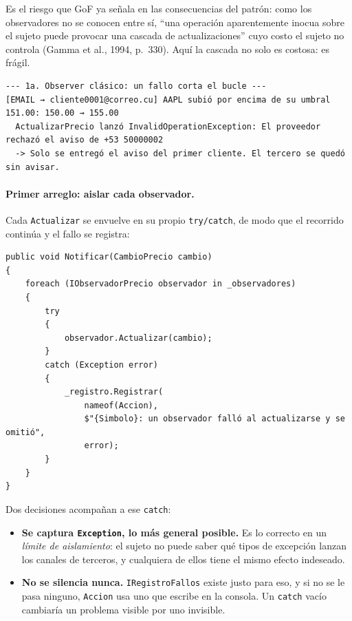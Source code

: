 Es el riesgo que GoF ya señala en las consecuencias del patrón: como los observadores no se
conocen entre sí, ``una operación aparentemente inocua sobre el sujeto puede provocar una
cascada de actualizaciones'' cuyo costo el sujeto no controla (Gamma et al., 1994, p.~330).
Aquí la cascada no solo es costosa: es frágil.

\begin{lstlisting}[language={}, numbers=none, basicstyle=\ttfamily\scriptsize, columns=fullflexible, keepspaces=true, caption={Demostración: el Subject clásico con un canal caído en el medio.}]
--- 1a. Observer clásico: un fallo corta el bucle ---
[EMAIL → cliente0001@correo.cu] AAPL subió por encima de su umbral 151.00: 150.00 → 155.00
  ActualizarPrecio lanzó InvalidOperationException: El proveedor rechazó el aviso de +53 50000002
  -> Solo se entregó el aviso del primer cliente. El tercero se quedó sin avisar.
\end{lstlisting}

\paragraph{Primer arreglo: aislar cada observador.}
Cada \texttt{Actualizar} se envuelve en su propio \texttt{try/catch}, de modo que el
recorrido continúa y el fallo se registra:

\begin{lstlisting}[basicstyle=\ttfamily\footnotesize, columns=fullflexible, keepspaces=true, caption={\texttt{Accion}: el fallo de un observador ya no corta el bucle.}]
public void Notificar(CambioPrecio cambio)
{
    foreach (IObservadorPrecio observador in _observadores)
    {
        try
        {
            observador.Actualizar(cambio);
        }
        catch (Exception error)
        {
            _registro.Registrar(
                nameof(Accion),
                $"{Simbolo}: un observador falló al actualizarse y se omitió",
                error);
        }
    }
}
\end{lstlisting}

Dos decisiones acompañan a ese \texttt{catch}:

\begin{itemize}
  \item \textbf{Se captura \texttt{Exception}, lo más general posible.} Es lo correcto en un
        \emph{límite de aislamiento}: el sujeto no puede saber qué tipos de excepción lanzan
        los canales de terceros, y cualquiera de ellos tiene el mismo efecto indeseado.
  \item \textbf{No se silencia nunca.} \texttt{IRegistroFallos} existe justo para eso, y si
        no se le pasa ninguno, \texttt{Accion} usa uno que escribe en la consola. Un
        \texttt{catch} vacío cambiaría un problema visible por uno invisible.
\end{itemize}

